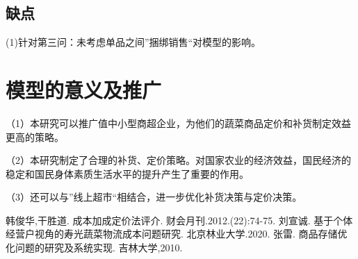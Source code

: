 \documentclass[withoutpreface,bwprint]{cumcmthesis} %
\begin{document}
\subsection{缺点}

(1)针对第三问：未考虑单品之间”捆绑销售“对模型的影响。

\section{模型的意义及推广}
（1）本研究可以推广值中小型商超企业，为他们的蔬菜商品定价和补货制定效益更高的策略。

（2）本研究制定了合理的补货、定价策略。对国家农业的经济效益，国民经济的稳定和国民身体素质生活水平的提升产生了重要的作用。

（3）还可以与”线上超市“相结合，进一步优化补货决策与定价决策。


\begin{thebibliography}{9}%
    韩俊华,干胜道.
    \newblock 成本加成定价法评介\allowbreak[J].
    \newblock 财会月刊.2012.(22):74-75.
    刘宣诚.
    \newblock 基于个体经营户视角的寿光蔬菜物流成本问题研究\allowbreak[D].
    \newblock 北京林业大学.2020.
    张雷.
    \newblock 商品存储优化问题的研究及系统实现\allowbreak[D].
    \newblock 吉林大学,2010.
\end{thebibliography}


\newpage
\appendix
\end{document}
